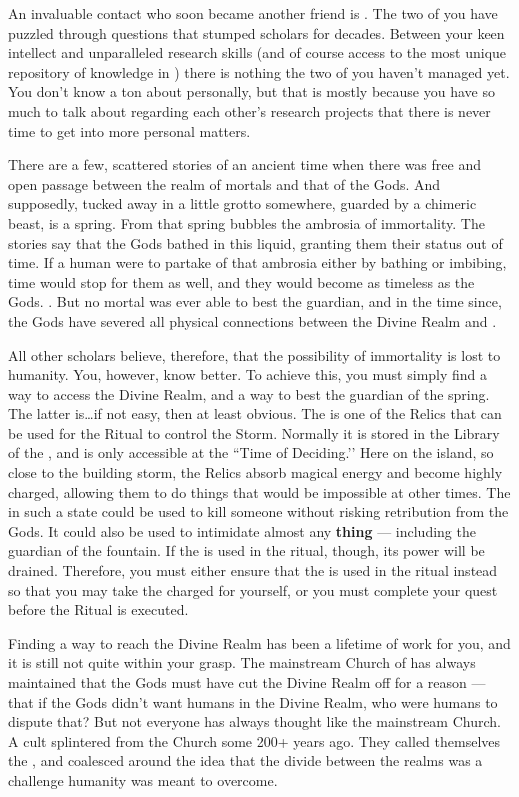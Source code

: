 \documentclass[char]{GL2020}
\begin{document}
An invaluable contact who soon became another friend is \cLibrarian{\intro}. The two of you have puzzled through questions that stumped scholars for decades. Between your keen intellect and \cLibrarian{\their} unparalleled research skills (and of course access to the most unique repository of knowledge in \pEarth{}) there is nothing the two of you haven’t managed yet. You don’t know a ton about \cLibrarian{\them} personally, but that is mostly because you have so much to talk about regarding each other’s research projects that there is never time to get into more personal matters.

There are a few, scattered stories of an ancient time when there was free and open passage between the realm of mortals and that of the Gods. And supposedly, tucked away in a little grotto somewhere, guarded by a chimeric beast, is a spring. From that spring bubbles the ambrosia of immortality. The stories say that the Gods bathed in this liquid, granting them their status out of time. If a human were to partake of that ambrosia either by bathing or imbibing, time would stop for them as well, and they would become as timeless as the Gods. . But no mortal was ever able to best the guardian, and in the time since, the Gods have severed all physical connections between the Divine Realm and \pEarth{}.

All other scholars believe, therefore, that the possibility of immortality is lost to humanity. You, however, know better. To achieve this, you must simply find a way to access the Divine Realm, and a way to best the guardian of the spring. The latter is\ldots if not easy, then at least obvious. 
The \iScythe{} is one of the \pFarm{} Relics that can be used for the Ritual to control the Storm. Normally it is stored in the Library of the \pSc{}, and is only accessible at the ``Time of Deciding.’’ Here on the island, so close to the building storm, the Relics absorb magical energy and become highly charged, allowing them to do things that would be impossible at other times. The \iScythe{} in such a state could be used to kill someone without risking retribution from the Gods. It could also be used to intimidate almost any \textbf{thing} — including the guardian of the fountain. If the \iScythe{} is used in the ritual, though, its power will be drained. Therefore, you must either ensure that the \iPitcher{} is used in the ritual instead so that you may take the charged \iScythe{} for yourself, or you must complete your quest before the Ritual is executed.

Finding a way to reach the Divine Realm has been a lifetime of work for you, and it is still not quite within your grasp. The mainstream Church of \cFarmGod{\intro} has always maintained that the Gods must have cut the Divine Realm off for a reason — that if the Gods didn’t want humans in the Divine Realm, who were humans to dispute that? But not everyone has always thought like the mainstream Church. A cult splintered from the Church some 200+ years ago. They called themselves the \cDisneySect{\intro}, and coalesced around the idea that the divide between the realms was a challenge humanity was meant to overcome.
\end{document}
